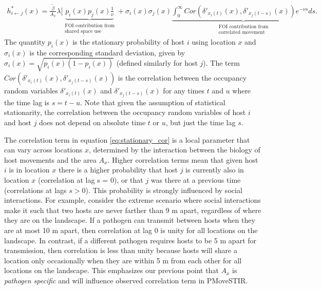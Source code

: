 ﻿\documentclass[11pt]{article}
\begin{document}
\begin{equation}
    \begin{aligned}
    h^*_{i \leftarrow j}(x) = \frac{\tilde\beta}{A_x} \lambda [ \underbrace{p_i(x)p_j(x) \frac{1}{\nu}}_{\substack{\text{FOI contribution from} \\ \text{shared space use}}} + \sigma_i(x) \sigma_j(x) \underbrace{\int_{0}^{\infty} Cor(\delta'_{x_i(t)}(x), \delta'_{x_j(t - s)}(x)) e^{-\nu s} ds}_{\substack{\text{FOI contribution from} \\ \text{correlated movement}}}.
    \end{aligned}
    \label{eq:stationary_cor}
\end{equation}
The quantity $p_i(x)$ is the stationary probability of host $i$ using location $x$ and $\sigma_i(x)$ is the corresponding standard deviation, given by $\sigma_i(x)= \sqrt{p_i(x)(1 - p_i(x))}$ (defined similarly for host $j$). The term $Cor(\delta'_{x_i(t)}(x), \delta'_{x_j(t - s)}(x))$ is the correlation between the occupancy random variables $\delta'_{x_i(t)}(x)$ and $\delta'_{x_j(t - s)}(x)$ for any times $t$ and $u$ where the time lag is $s = t-u$.  %
Note that given the assumption of statistical stationarity, the correlation between the occupancy random variables of host $i$ and host $j$ does not depend on absolute time $t$ or $u$, but just the time lag $s$.  

The correlation term in equation \ref{eq:stationary_cor} is a local parameter that can vary across locations $x$, determined by the interaction between the biology of host movements and the area $A_x$.  Higher correlation terms mean that given host $i$ is in location $x$ there is a higher probability that host $j$ is currently also in location $x$ (correlation at lag s = 0), or that $j$ was there at a previous time (correlations at lags $s > 0$). This probability is strongly influenced by social interactions.  For example, consider the extreme scenario where social interactions make it such that two hosts are never farther than 9 m apart, regardless of where they are on the landscape. If a pathogen can transmit between hosts when they are at most 10 m apart, then correlation at lag 0 is unity for all locations on the landscape. 
In contrast, if a different pathogen requires hosts to be 5 m apart for transmission, then correlation is less than unity because hosts will share a location only occasionally when they are within 5 m from each other%
 for all locations on the landscape. This emphasizes our previous point that $A_x$ is \emph{pathogen specific} and will influence observed correlation term in PMoveSTIR.
\end{document}

